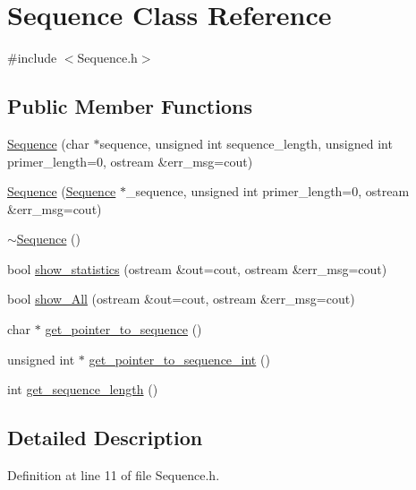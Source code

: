 \hypertarget{class_sequence}{}\section{Sequence Class Reference}
\label{class_sequence}


{\ttfamily \#include $<$Sequence.\+h$>$}

\subsection*{Public Member Functions}
\begin{DoxyCompactItemize}
\item 
\mbox{\hyperlink{class_sequence_acdd11b606b266e81cc5b957e86b45517}{Sequence}} (char $\ast$sequence, unsigned int sequence\+\_\+length, unsigned int primer\+\_\+length=0, ostream \&err\+\_\+msg=cout)
\item 
\mbox{\hyperlink{class_sequence_ad6f16ee0cacbb22596c7a34d8a2f4c14}{Sequence}} (\mbox{\hyperlink{class_sequence}{Sequence}} $\ast$\+\_\+sequence, unsigned int primer\+\_\+length=0, ostream \&err\+\_\+msg=cout)
\item 
\mbox{\hyperlink{class_sequence_aee09a7d70c3ab523fed85da94ea1366f}{$\sim$\+Sequence}} ()
\item 
bool \mbox{\hyperlink{class_sequence_adfd0c2b8558f68f764a7690ed9ad4adc}{show\+\_\+statistics}} (ostream \&out=cout, ostream \&err\+\_\+msg=cout)
\item 
bool \mbox{\hyperlink{class_sequence_a01816c20cdd1c716a30b03c24a5a2b7f}{show\+\_\+\+All}} (ostream \&out=cout, ostream \&err\+\_\+msg=cout)
\item 
char $\ast$ \mbox{\hyperlink{class_sequence_a9c1e7770390e4f1d02ae250d640a32a7}{get\+\_\+pointer\+\_\+to\+\_\+sequence}} ()
\item 
unsigned int $\ast$ \mbox{\hyperlink{class_sequence_af37c4ac41b89a5081ca71ff2a9d9bd1c}{get\+\_\+pointer\+\_\+to\+\_\+sequence\+\_\+int}} ()
\item 
int \mbox{\hyperlink{class_sequence_a5454c394570fa19c2b0ac771c6e74097}{get\+\_\+sequence\+\_\+length}} ()
\end{DoxyCompactItemize}


\subsection{Detailed Description}


Definition at line 11 of file Sequence.\+h.



